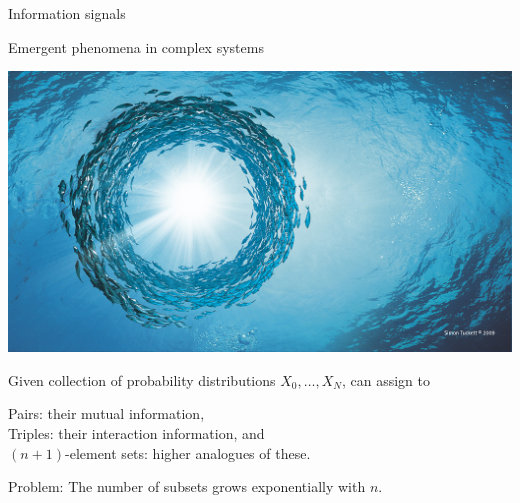 \documentclass[10pt,t]{beamer} %
\begin{document}
\begin{frame}{Information signals}
	
	Emergent phenomena in complex systems 
	
	\begin{center}
		\includegraphics[scale=.15]{fishes}
	\end{center}

	\vskip 5pt
	\pause
	
	Given collection of probability distributions $X_0, \dots, X_N$, can assign to
	
	\vskip 5pt
	
	\quad Pairs: their mutual information, \\
	\quad Triples: their interaction information, and\\
	\quad $(n+1)$-element sets: higher analogues of these.
	
	\vskip 5pt
	\pause
	
	\textcolor{pblue}{Problem:} The number of subsets grows exponentially with $n$.
\end{frame}
\end{document}
